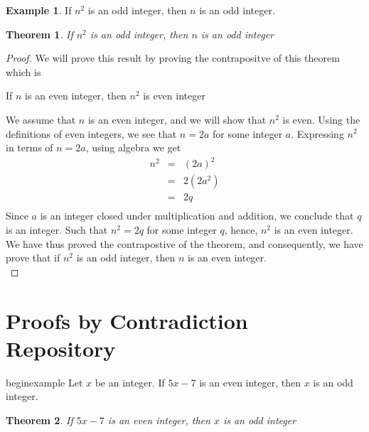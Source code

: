\documentclass{book}
\newtheorem{theorem}{Theorem}[section]
\theoremstyle{definition}
\newtheorem{example}{Example}[definition]
\theoremstyle{remark}
\begin{document}
\begin{example}
If $n^2$ is an odd integer, then $n$ is an odd integer. \\

\begin{tcolorbox}
	\begin{theorem}
	\label{the}		
		If $n^2$ is an odd integer, then $n$ is an odd integer
	\end{theorem}
\end{tcolorbox}

\begin{proof}
We will prove this result by proving the contrapositve of this theorem which is
	\begin{center}
		If $n$ is an even integer, then $n^2$ is even integer
	\end{center}

We assume that $n$ is an even integer, and we will show that $n^2$ is even. Using the definitions of even integers, we see that $n = 2a$ for some integer $a$. Expressing $n^2$ in terms of $n = 2a$, using algebra we get
	\begin{eqnarray*}
		n^2 & = & (2a)^2  \nonumber \\ 
		& = & 2(2a^2) \nonumber \\
		& = & 2q \nonumber \\
	\end{eqnarray*}
Since $a$ is an integer closed under multiplication and addition, we conclude that $q$ is an integer. Such that $n^2 = 2q$ for some integer $q$, hence, $n^2$ is an even integer. We have thus proved the contrapostive of the theorem, and consequently, we have prove that if $n^2$ is an odd integer, then $n$ is an even integer. \\
\end{proof}
\end{example}



\section{Proofs by Contradiction Repository}
begin{example}
Let $x$ be an integer. If $5x - 7$ is an even integer, then $x$ is an odd integer. \\

\begin{tcolorbox}
	\begin{theorem}
	\label{the}		
		If $5x - 7$ is an even integer, then $x$ is an odd integer
	\end{theorem}
\end{tcolorbox}
\end{document}
